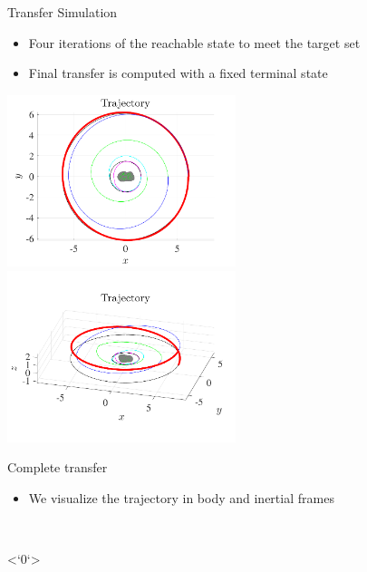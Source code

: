 \begin{frame}{Transfer Simulation}
    \begin{itemize}
        \item Four iterations of the reachable state to meet the target set
        \item Final transfer is computed with a fixed terminal state
    \end{itemize}

    \begin{center}
        \includegraphics[width=0.5\textwidth,height=0.7\textheight,keepaspectratio]{figures/2016AAS/trajectory.pdf}~
        \includegraphics[width=0.5\textwidth,height=0.7\textheight,keepaspectratio]{figures/2016AAS/trajectory_3d.pdf}
    \end{center}

\end{frame}

\begin{frame}{Complete transfer}
\begin{itemize}
    \item We visualize the trajectory in body and inertial frames
\end{itemize}

\begin{center}
  ~\hfill
\end{center}

\end{frame}
<`0`>
